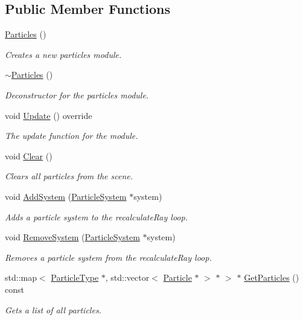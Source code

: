 \subsection*{Public Member Functions}
\begin{DoxyCompactItemize}
\item 
\hyperlink{class_flounder_1_1_particles_a2a3ea08ca1a300ad553f5f7c62d91218}{Particles} ()
\begin{DoxyCompactList}\small\item\em Creates a new particles module. \end{DoxyCompactList}\item 
\hyperlink{class_flounder_1_1_particles_a66d498e4d7f0dfb995e215a42bda30e0}{$\sim$\+Particles} ()
\begin{DoxyCompactList}\small\item\em Deconstructor for the particles module. \end{DoxyCompactList}\item 
void \hyperlink{class_flounder_1_1_particles_af57df35b8793f94a31e3c40413ebd29f}{Update} () override
\begin{DoxyCompactList}\small\item\em The update function for the module. \end{DoxyCompactList}\item 
void \hyperlink{class_flounder_1_1_particles_af0944c0f48a6868c19e9116287a5b44b}{Clear} ()
\begin{DoxyCompactList}\small\item\em Clears all particles from the scene. \end{DoxyCompactList}\item 
void \hyperlink{class_flounder_1_1_particles_a751919029f6a6b4dcbe4dba3b89834da}{Add\+System} (\hyperlink{class_flounder_1_1_particle_system}{Particle\+System} $\ast$system)
\begin{DoxyCompactList}\small\item\em Adds a particle system to the recalculate\+Ray loop. \end{DoxyCompactList}\item 
void \hyperlink{class_flounder_1_1_particles_a6f70e6b3ba5e60cac13d200f93950627}{Remove\+System} (\hyperlink{class_flounder_1_1_particle_system}{Particle\+System} $\ast$system)
\begin{DoxyCompactList}\small\item\em Removes a particle system from the recalculate\+Ray loop. \end{DoxyCompactList}\item 
std\+::map$<$ \hyperlink{class_flounder_1_1_particle_type}{Particle\+Type} $\ast$, std\+::vector$<$ \hyperlink{class_flounder_1_1_particle}{Particle} $\ast$ $>$ $\ast$ $>$ $\ast$ \hyperlink{class_flounder_1_1_particles_a8e856a511e04a38fbb0b168bab418c48}{Get\+Particles} () const
\begin{DoxyCompactList}\small\item\em Gets a list of all particles. \end{DoxyCompactList}\end{DoxyCompactItemize}
